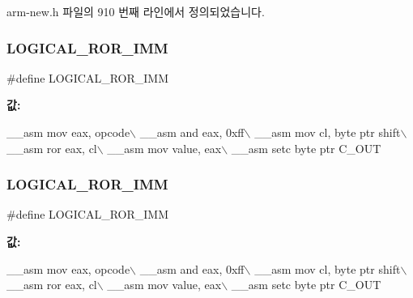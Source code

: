 arm-\/new.\+h 파일의 910 번째 라인에서 정의되었습니다.

\mbox{\label{_g_b_a_8cpp_a0e8f41a2fd38dcb560fb3e0558594281}} 
\subsubsection{\texorpdfstring{L\+O\+G\+I\+C\+A\+L\+\_\+\+R\+O\+R\+\_\+\+I\+MM}{LOGICAL\_ROR\_IMM}\hspace{0.1cm}{\footnotesize\ttfamily [1/2]}}
{\footnotesize\ttfamily \#define L\+O\+G\+I\+C\+A\+L\+\_\+\+R\+O\+R\+\_\+\+I\+MM}

{\bfseries 값\+:}
\begin{DoxyCode}
\_\_asm mov eax, opcode\(\backslash\)
        \_\_asm and eax, 0xff\(\backslash\)
        \_\_asm mov cl, byte ptr shift\(\backslash\)
        \_\_asm ror eax, cl\(\backslash\)
        \_\_asm mov value, eax\(\backslash\)
        \_\_asm setc byte ptr C\_OUT
\end{DoxyCode}
\mbox{\label{arm-new_8h_a0e8f41a2fd38dcb560fb3e0558594281}} 
\subsubsection{\texorpdfstring{L\+O\+G\+I\+C\+A\+L\+\_\+\+R\+O\+R\+\_\+\+I\+MM}{LOGICAL\_ROR\_IMM}\hspace{0.1cm}{\footnotesize\ttfamily [2/2]}}
{\footnotesize\ttfamily \#define L\+O\+G\+I\+C\+A\+L\+\_\+\+R\+O\+R\+\_\+\+I\+MM}

{\bfseries 값\+:}
\begin{DoxyCode}
\_\_asm mov eax, opcode\(\backslash\)
        \_\_asm and eax, 0xff\(\backslash\)
        \_\_asm mov cl, byte ptr shift\(\backslash\)
        \_\_asm ror eax, cl\(\backslash\)
        \_\_asm mov value, eax\(\backslash\)
        \_\_asm setc byte ptr C\_OUT
\end{DoxyCode}


